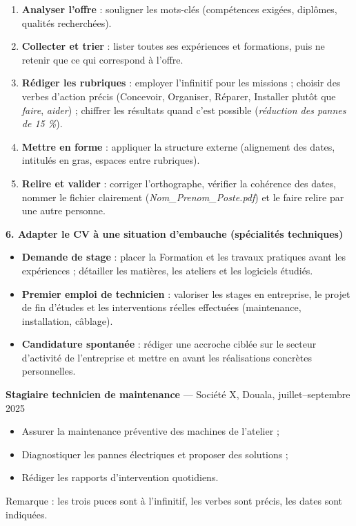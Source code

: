 \documentclass[11pt]{article}
\newcommand{\cle}[1]{{\popxbold\color{popdark}#1}}
\begin{document}
\begin{methode}
\begin{enumerate}
    \item \textbf{Analyser l'offre} : souligner les mots-clés (compétences exigées, diplômes, qualités recherchées).
    \item \textbf{Collecter et trier} : lister toutes ses expériences et formations, puis ne retenir que ce qui correspond à l'offre.
    \item \textbf{Rédiger les rubriques} : employer l'infinitif pour les missions ; choisir des verbes d'action précis (\cle{Concevoir}, \cle{Organiser}, \cle{Réparer}, \cle{Installer} plutôt que \emph{faire}, \emph{aider}) ; chiffrer les résultats quand c'est possible (\emph{réduction des pannes de 15 \%}).
    \item \textbf{Mettre en forme} : appliquer la structure externe (alignement des dates, intitulés en gras, espaces entre rubriques).
    \item \textbf{Relire et valider} : corriger l'orthographe, vérifier la cohérence des dates, nommer le fichier clairement (\emph{Nom\_Prenom\_Poste.pdf}) et le faire relire par une autre personne.
\end{enumerate}
\end{methode}

\textbf{6. Adapter le CV à une situation d'embauche (spécialités techniques)}\par
\begin{itemize}
    \item \textbf{Demande de stage} : placer la \cle{Formation} et les \cle{travaux pratiques} avant les expériences ; détailler les matières, les ateliers et les logiciels étudiés.
    \item \textbf{Premier emploi de technicien} : valoriser les \cle{stages} en entreprise, le \cle{projet de fin d'études} et les interventions réelles effectuées (maintenance, installation, câblage).
    \item \textbf{Candidature spontanée} : rédiger une accroche ciblée sur le secteur d'activité de l'entreprise et mettre en avant les réalisations concrètes personnelles.
\end{itemize}

\begin{exemplebox}
\textbf{Stagiaire technicien de maintenance} — Société X, Douala, juillet--septembre 2025
\begin{itemize}
    \item Assurer la maintenance préventive des machines de l'atelier ;
    \item Diagnostiquer les pannes électriques et proposer des solutions ;
    \item Rédiger les rapports d'intervention quotidiens.
\end{itemize}
Remarque : les trois puces sont à l'infinitif, les verbes sont précis, les dates sont indiquées.
\end{exemplebox}
\end{document}

